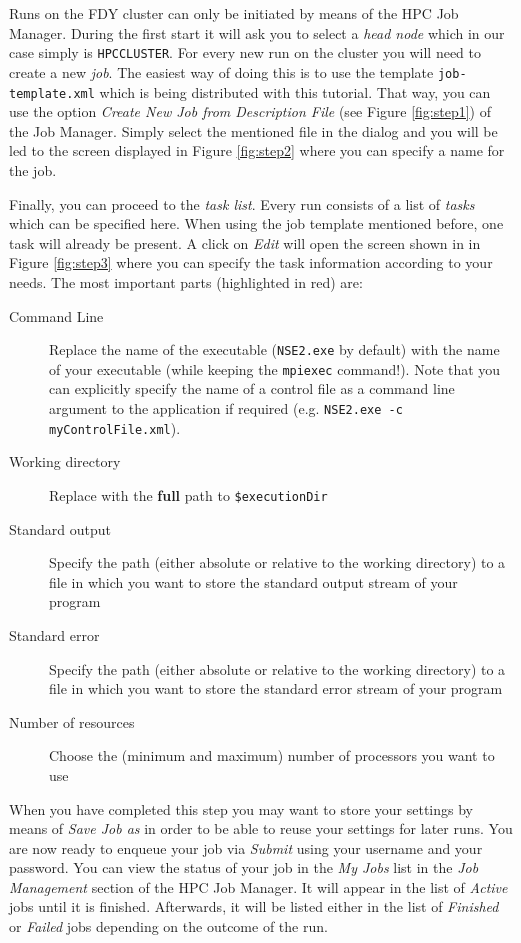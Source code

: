 \documentclass[11pt,twoside,a4paper]{fdyartcl}
\theoremstyle{myPlain}
\theoremstyle{myDefinition}
\begin{document}
Runs on the FDY cluster can only be initiated by means of the HPC Job Manager.
During the first start it will ask you to select a \emph{head node} which in 
our case simply is \verb|HPCCLUSTER|. For every new run on the cluster you will
need to create a new \emph{job}. The easiest way of doing this is to use the
template \verb|job-template.xml| which is being distributed with this tutorial.
That way, you can use the option \emph{Create New Job from Description File}
(see Figure \ref{fig:step1}) of the Job Manager. Simply select the mentioned 
file in the dialog and you will be led to the screen displayed in Figure
\ref{fig:step2} where you can specify a name for the job.

Finally, you can proceed to the \emph{task list}. Every run consists of a list 
of \emph{tasks} which can be specified here. When using the job template 
mentioned before, one task will already be present. A click on \emph{Edit} 
will open the screen shown in in Figure \ref{fig:step3} where you can specify
the task information according to your needs. The most important parts 
(highlighted in red) are:
\begin{description}
	\item[Command Line] Replace the name of the executable (\verb|NSE2.exe| by default) with the name of your executable (while keeping the \verb|mpiexec| command!). Note that you can explicitly specify the name of a control file as a command line argument to the application if required (e.g. \verb|NSE2.exe -c myControlFile.xml|).
	\item[Working directory] Replace with the \textbf{full} path to \verb|$executionDir|
	\item[Standard output] Specify the path (either absolute or relative to the working directory) to a file in which you want to store the standard output stream of your program
	\item[Standard error] Specify the path (either absolute or relative to the working directory) to a file in which you want to store the standard error stream of your program
	\item[Number of resources] Choose the (minimum and maximum) number of processors you want to use
\end{description}

When you have completed this step you may want to store your settings by means 
of \emph{Save Job as} in order to be able to reuse your settings for later 
runs. You are now ready to enqueue your job via \emph{Submit} using your 
username and your password. You can view the status of your job in the
\emph{My Jobs} list in the \emph{Job Management} section of the HPC Job 
Manager. It will appear in the list of \emph{Active} jobs until it is 
finished. Afterwards, it will be listed either in the list of \emph{Finished} 
or \emph{Failed} jobs depending on the outcome of the run.
\end{document}
